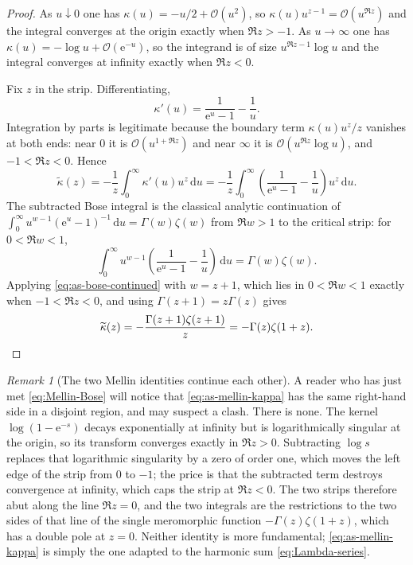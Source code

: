 \documentclass[11pt,oneside]{article}
\theoremstyle{definition}
\theoremstyle{remark}
\newtheorem{remark}[theorem]{Remark}
\newcommand{\e}{\mathrm e}
\newcommand{\dd}{\,\mathrm d}
\newcommand{\bigO}{\mathcal O}
\begin{document}
\begin{proof}
As $u\downarrow0$ one has $\kappa(u)=-u/2+\bigO(u^2)$, so $\kappa(u)u^{z-1}=\bigO(u^{\Re z})$
and the integral converges at the origin exactly when $\Re z>-1$.  As $u\to\infty$ one has
$\kappa(u)=-\log u+\bigO(\e^{-u})$, so the integrand is of size $u^{\Re z-1}\log u$ and the
integral converges at infinity exactly when $\Re z<0$.

Fix $z$ in the strip.  Differentiating,
\begin{equation}
 \kappa'(u)=\frac{1}{\e^{u}-1}-\frac1u.                    \label{eq:as-kappa-derivative}
\end{equation}
Integration by parts is legitimate because the boundary term $\kappa(u)u^{z}/z$ vanishes at
both ends: near $0$ it is $\bigO(u^{1+\Re z})$ and near $\infty$ it is
$\bigO(u^{\Re z}\log u)$, and $-1<\Re z<0$.  Hence
\begin{equation*}
 \widetilde\kappa(z)=-\frac1z\int_0^{\infty}\kappa'(u)u^{z}\dd u
 =-\frac1z\int_0^{\infty}\left(\frac1{\e^{u}-1}-\frac1u\right)u^{z}\dd u.
\end{equation*}
The subtracted Bose integral is the classical analytic continuation of
$\int_0^\infty u^{w-1}(\e^u-1)^{-1}\dd u=\Gamma(w)\zeta(w)$ from $\Re w>1$ to the critical
strip: for $0<\Re w<1$,
\begin{equation}
 \int_0^{\infty}u^{w-1}\left(\frac1{\e^{u}-1}-\frac1u\right)\dd u=\Gamma(w)\zeta(w).
                                                          \label{eq:as-bose-continued}
\end{equation}
Applying \eqref{eq:as-bose-continued} with $w=z+1$, which lies in $0<\Re w<1$ exactly when
$-1<\Re z<0$, and using $\Gamma(z+1)=z\Gamma(z)$ gives
\begin{equation*}
 \widetilde\kappa(z)=-\frac{\Gamma(z+1)\zeta(z+1)}{z}=-\Gamma(z)\zeta(1+z).\qedhere
\end{equation*}
\end{proof}

\begin{remark}[The two Mellin identities continue each other]
\label{rem:as-two-strips}
A reader who has just met \eqref{eq:Mellin-Bose} will notice that \eqref{eq:as-mellin-kappa}
has the same right-hand side in a disjoint region, and may suspect a clash.  There is none.
The kernel $\log(1-\e^{-s})$ decays exponentially at infinity but is logarithmically singular
at the origin, so its transform converges exactly in $\Re z>0$.  Subtracting $\log s$ replaces
that logarithmic singularity by a zero of order one, which moves the left edge of the strip
from $0$ to $-1$; the price is that the subtracted term destroys convergence at infinity,
which caps the strip at $\Re z<0$.  The two strips therefore abut along the line $\Re z=0$,
and the two integrals are the restrictions to the two sides of that line of the single
meromorphic function $-\Gamma(z)\zeta(1+z)$, which has a double pole at $z=0$.  Neither
identity is more fundamental; \eqref{eq:as-mellin-kappa} is simply the one adapted to the
harmonic sum \eqref{eq:Lambda-series}.
\end{remark}
\end{document}
